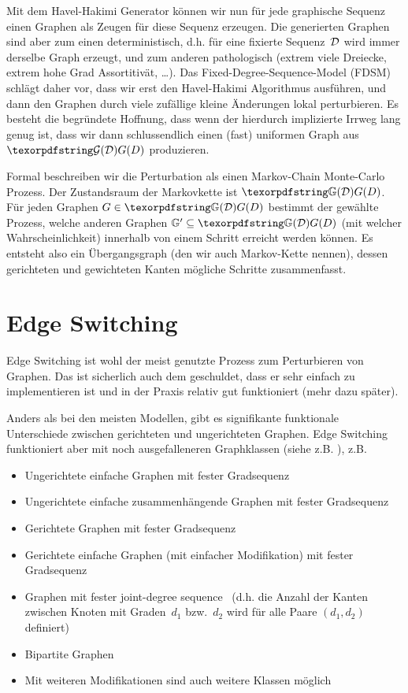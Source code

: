 Mit dem Havel-Hakimi Generator können wir nun für jede graphische Sequenz einen Graphen als Zeugen für diese Sequenz erzeugen.
Die generierten Graphen sind aber zum einen deterministisch, d.h. für eine fixierte Sequenz~$\mathcal{D}$ wird immer derselbe Graph erzeugt, und zum anderen pathologisch (extrem viele Dreiecke, extrem hohe Grad Assortitivät, \ldots).
Das Fixed-Degree-Sequence-Model (FDSM) schlägt daher vor, dass wir erst den Havel-Hakimi Algorithmus ausführen, und dann den Graphen durch viele zufällige kleine Änderungen lokal perturbieren.
Es besteht die begründete Hoffnung, dass wenn der hierdurch implizierte Irrweg lang genug ist, dass wir dann schlussendlich einen (fast) uniformen Graph aus $\Gd$ produzieren.

Formal beschreiben wir die Perturbation als einen Markov-Chain Monte-Carlo Prozess.
Der Zustandsraum der Markovkette ist $\gd$.
Für jeden Graphen $G \in \gd$ bestimmt der gewählte Prozess, welche anderen Graphen $\mathbb G' \subseteq \gd$ (mit welcher Wahrscheinlichkeit) innerhalb von einem Schritt erreicht werden können.
Es entsteht also ein  Übergangsgraph (den wir auch Markov-Kette nennen), dessen gerichteten und gewichteten Kanten mögliche Schritte zusammenfasst.

\section{Edge Switching}
Edge Switching ist wohl der meist genutzte Prozess zum Perturbieren von Graphen.
Das ist sicherlich auch dem geschuldet, dass er sehr einfach zu implementieren ist und in der Praxis relativ gut funktioniert (mehr dazu später).

Anders als bei den meisten Modellen, gibt es signifikante funktionale Unterschiede zwischen gerichteten und ungerichteten Graphen.
Edge Switching funktioniert aber mit noch ausgefalleneren Graphklassen (siehe z.B. \cite{carstens_2017}), z.B.
\begin{itemize}
    \item Ungerichtete einfache Graphen mit fester Gradsequenz
    \item Ungerichtete einfache zusammenhängende Graphen  mit fester Gradsequenz \cite{DBLP:journals/compnet/VigerL16}
    \item Gerichtete Graphen  mit fester Gradsequenz
    \item Gerichtete einfache Graphen (mit einfacher Modifikation)  mit fester Gradsequenz
    \item Graphen mit fester joint-degree sequence~\cite{DBLP:conf/alenex/StantonP11} (d.h. die Anzahl der Kanten zwischen Knoten mit Graden~$d_1$ bzw.~$d_2$ wird für alle Paare $(d_1, d_2)$ definiert)
    \item Bipartite Graphen
    \item Mit weiteren Modifikationen sind auch weitere Klassen möglich
\end{itemize}

